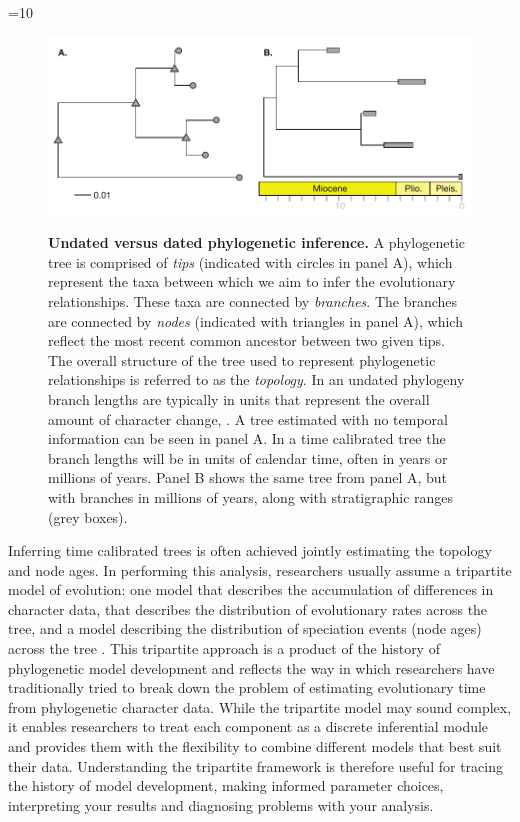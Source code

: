 \ifnum\value{num}=10 {
\begin{figure}
\centering
\includegraphics[width=\textwidth]{Cambridge-Elements/manuscript.R2/submitted_figs//figure1}
\label{fig:undated}
\caption{\footnotesize\textbf{Undated versus dated phylogenetic inference.}
A phylogenetic tree is comprised of \textit{tips} (indicated with circles in panel A), which represent the taxa between which we aim to infer the evolutionary relationships.
These taxa are connected by \textit{branches}. 
The branches are connected by \textit{nodes} (indicated with triangles in panel A), which reflect the most recent common ancestor between two given tips. 
The overall structure of the tree used to represent phylogenetic relationships is referred to as the \textit{topology}.
In an undated phylogeny branch lengths are typically in units that represent the overall amount of character change, .
A tree estimated with no temporal information can be seen in panel A.
In a time calibrated tree the branch lengths will be in units of calendar time, often in years or millions of years. 
Panel B shows the same tree from panel A, but with branches in millions of years, along with stratigraphic ranges (grey boxes).}
\label{fig:undated}
\end{figure} }\else{}\fi

Inferring time calibrated trees is often achieved  jointly estimating the topology and node ages.
In performing this analysis, researchers usually assume a tripartite model of evolution: one model that describes the accumulation of differences in character data,  that describes the distribution of evolutionary rates across the tree, and a  model describing the distribution of speciation events (node ages) across the tree \citep{Thorne1998,Kishino2001,Yang2006,Drummond2006}.
This tripartite approach is a product of the history of phylogenetic model development and reflects the way in which researchers have traditionally tried to break down the problem of estimating evolutionary time from phylogenetic character data.
While the tripartite model may sound complex, it enables researchers to treat each component as a discrete inferential module and provides them with the flexibility to combine different models that best suit their data.
Understanding the tripartite framework is therefore useful for tracing the history of model development, making informed parameter choices, interpreting your results and diagnosing problems with your analysis.

